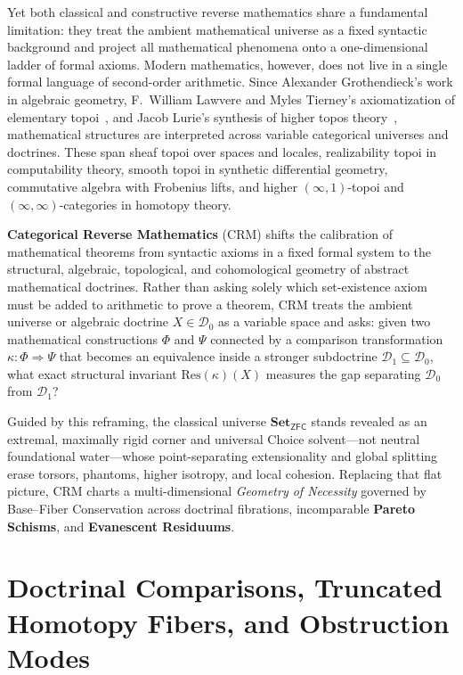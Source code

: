 Yet both classical and constructive reverse mathematics share a fundamental limitation: they treat the ambient mathematical universe as a fixed syntactic background and project all mathematical phenomena onto a one-dimensional ladder of formal axioms. Modern mathematics, however, does not live in a single formal language of second-order arithmetic. Since Alexander Grothendieck's work in algebraic geometry, F.~William Lawvere and Myles Tierney's axiomatization of elementary topoi~\cite{MacLaneMoerdijk92,Johnstone02}, and Jacob Lurie's synthesis of higher topos theory~\cite{Lurie09}, mathematical structures are interpreted across variable categorical universes and doctrines. These span sheaf topoi over spaces and locales, realizability topoi in computability theory, smooth topoi in synthetic differential geometry, commutative algebra with Frobenius lifts, and higher $(\infty, 1)$-topoi and $(\infty, \infty)$-categories in homotopy theory.

\textbf{Categorical Reverse Mathematics} ($\mathrm{CRM}$) shifts the calibration of mathematical theorems from syntactic axioms in a fixed formal system to the structural, algebraic, topological, and cohomological geometry of abstract mathematical doctrines. Rather than asking solely which set-existence axiom must be added to arithmetic to prove a theorem, $\mathrm{CRM}$ treats the ambient universe or algebraic doctrine $X \in \mathcal{D}_0$ as a variable space and asks: given two mathematical constructions $\Phi$ and $\Psi$ connected by a comparison transformation $\kappa : \Phi \Rightarrow \Psi$ that becomes an equivalence inside a stronger subdoctrine $\mathcal{D}_1 \subseteq \mathcal{D}_0$, what exact structural invariant $\mathrm{Res}(\kappa)(X)$ measures the gap separating $\mathcal{D}_0$ from $\mathcal{D}_1$?

Guided by this reframing, the classical universe $\mathbf{Set}_{\mathsf{ZFC}}$ stands revealed as an extremal, maximally rigid corner and universal Choice solvent---not neutral foundational water---whose point-separating extensionality and global splitting erase torsors, phantoms, higher isotropy, and local cohesion. Replacing that flat picture, $\mathrm{CRM}$ charts a multi-dimensional \emph{Geometry of Necessity} governed by Base--Fiber Conservation across doctrinal fibrations, incomparable \textbf{Pareto Schisms}, and \textbf{Evanescent Residuums}.

\section{Doctrinal Comparisons, Truncated Homotopy Fibers, and Obstruction Modes}\label{sec:fundamental-equivalence}

